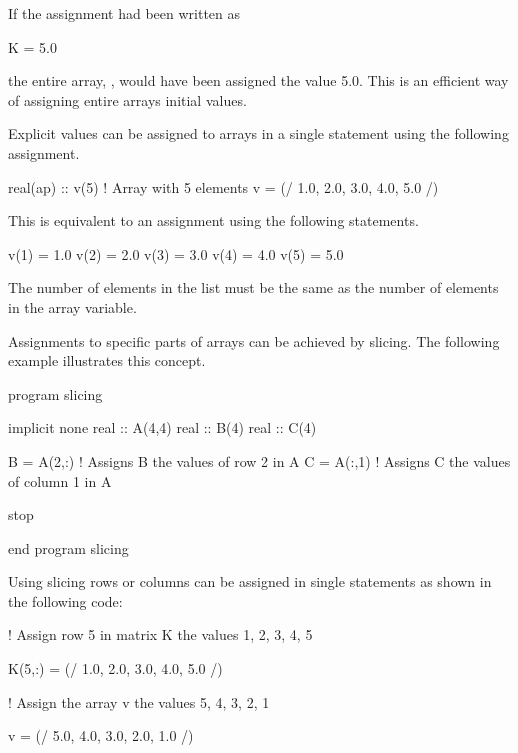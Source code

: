 If the assignment had been written as

\begin{fortrancodeenv}
K = 5.0
\end{fortrancodeenv}

the entire array, , would have been assigned the value 5.0. This is an efficient way of assigning entire arrays
initial values.

Explicit values can be assigned to arrays in a single statement using the following assignment.

\begin{fortrancodeenv}
real(ap) :: v(5) ! Array with 5 elements
v = (/ 1.0, 2.0, 3.0, 4.0, 5.0 /)
\end{fortrancodeenv}

This is equivalent to an assignment using the following statements.

\begin{fortrancodeenv}
v(1) = 1.0
v(2) = 2.0
v(3) = 3.0
v(4) = 4.0
v(5) = 5.0
\end{fortrancodeenv}

The number of elements in the list must be the same as the number of elements in the array variable.

Assignments to specific parts of arrays can be achieved by slicing. The following example illustrates this concept.

\begin{fortrancodeenv}
program slicing

    implicit none
    real :: A(4,4)
    real :: B(4)
    real :: C(4)

    B = A(2,:) ! Assigns B the values of row 2 in A
    C = A(:,1) ! Assigns C the values of column 1 in A

    stop

end program slicing
\end{fortrancodeenv}

Using slicing rows or columns can be assigned in single statements as shown in the following code:

\begin{fortrancodeenv}
! Assign row 5 in matrix K the values 1, 2, 3, 4, 5

K(5,:) = (/ 1.0, 2.0, 3.0, 4.0, 5.0 /)

! Assign the array v the values 5, 4, 3, 2, 1

v = (/ 5.0, 4.0, 3.0, 2.0, 1.0 /)
\end{fortrancodeenv}

